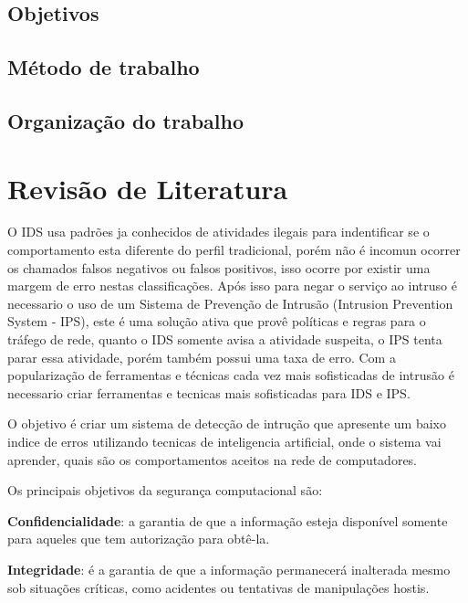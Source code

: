 \documentclass[
	12pt,				%
	openright,			%
	oneside,
	a4paper,			%
	english,			%
	french,				%
	spanish,			%
	brazil				%
	]{abntex2}
\begin{document}
\section{Objetivos}



\section{Método de trabalho}

\section{Organização do trabalho}

\chapter[Revisão de Literatura]{Revisão de Literatura}
O IDS usa padrões ja conhecidos de atividades ilegais para indentificar se o comportamento esta diferente do perfil tradicional, porém não é incomun ocorrer os chamados falsos negativos ou falsos positivos, isso ocorre por existir uma margem de erro nestas classificações. 
Após isso para negar o serviço ao intruso é necessario o uso de um Sistema de Prevenção de Intrusão (Intrusion Prevention System - IPS), este é uma solução ativa que provê políticas e regras para o tráfego de rede, quanto o IDS somente avisa a atividade suspeita, o IPS tenta parar essa atividade, porém também possui uma taxa de erro.
Com a popularização de ferramentas e técnicas cada vez mais sofisticadas de intrusão é necessario criar ferramentas e tecnicas mais sofisticadas para IDS e IPS.

O objetivo é criar um sistema de detecção de intrução que apresente um baixo indice de erros utilizando tecnicas de inteligencia artificial, onde o sistema vai aprender, quais são os comportamentos aceitos na rede de computadores.

Os principais objetivos da segurança computacional são:

\textbf{Confidencialidade}: a garantia de que a informação esteja disponível somente para aqueles que tem autorização para obtê-la.

\textbf{Integridade}: é a garantia de que a informação permanecerá inalterada mesmo sob situações críticas, como acidentes ou tentativas de manipulações hostis.
\end{document}
